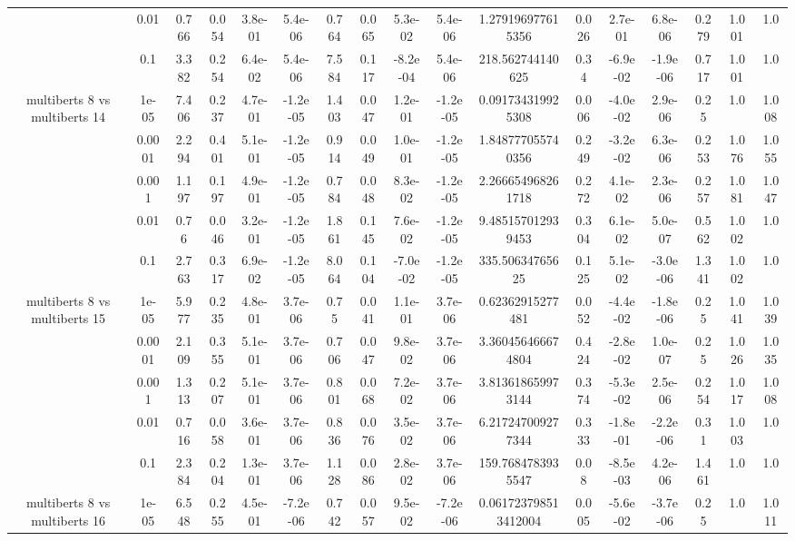 \begin{tabular}{|c|c|c|c|c|c|c|c|c|c|c|c|c|c|c|c|c|}
 & 0.01 & 0.766 & 0.054 & 3.8e-01 & 5.4e-06 & 0.764 & 0.065 & 5.3e-02 & 5.4e-06 & 1.279196977615356 & 0.026 & 2.7e-01 & 6.8e-06 & 0.279 & 1.001 & 1.0 \\
 & 0.1 & 3.382 & 0.254 & 6.4e-02 & 5.4e-06 & 7.584 & 0.117 & -8.2e-04 & 5.4e-06 & 218.562744140625 & 0.34 & -6.9e-02 & -1.9e-06 & 0.717 & 1.001 & 1.0 \\
\hline
\multirow{5}{*}{multiberts 8 vs multiberts 14} & 1e-05 & 7.406 & 0.237 & 4.7e-01 & -1.2e-05 & 1.403 & 0.047 & 1.2e-01 & -1.2e-05 & 0.091734319925308 & 0.006 & -4.0e-02 & 2.9e-06 & 0.25 & 1.0 & 1.008 \\
 & 0.0001 & 2.294 & 0.401 & 5.1e-01 & -1.2e-05 & 0.914 & 0.049 & 1.0e-01 & -1.2e-05 & 1.848777055740356 & 0.249 & -3.2e-02 & 6.3e-06 & 0.253 & 1.076 & 1.055 \\
 & 0.001 & 1.197 & 0.197 & 4.9e-01 & -1.2e-05 & 0.784 & 0.048 & 8.3e-02 & -1.2e-05 & 2.266654968261718 & 0.272 & 4.1e-02 & 2.3e-06 & 0.257 & 1.081 & 1.047 \\
 & 0.01 & 0.76 & 0.046 & 3.2e-01 & -1.2e-05 & 1.861 & 0.145 & 7.6e-02 & -1.2e-05 & 9.485157012939453 & 0.304 & 6.1e-02 & 5.0e-07 & 0.562 & 1.002 & 1.0 \\
 & 0.1 & 2.763 & 0.317 & 6.9e-02 & -1.2e-05 & 8.064 & 0.104 & -7.0e-02 & -1.2e-05 & 335.50634765625 & 0.125 & 5.1e-02 & -3.0e-06 & 1.341 & 1.002 & 1.0 \\
\hline
\multirow{5}{*}{multiberts 8 vs multiberts 15} & 1e-05 & 5.977 & 0.235 & 4.8e-01 & 3.7e-06 & 0.75 & 0.041 & 1.1e-01 & 3.7e-06 & 0.62362915277481 & 0.052 & -4.4e-02 & -1.8e-06 & 0.25 & 1.041 & 1.039 \\
 & 0.0001 & 2.109 & 0.355 & 5.1e-01 & 3.7e-06 & 0.706 & 0.047 & 9.8e-02 & 3.7e-06 & 3.360456466674804 & 0.424 & -2.8e-02 & 1.0e-07 & 0.25 & 1.026 & 1.035 \\
 & 0.001 & 1.313 & 0.207 & 5.1e-01 & 3.7e-06 & 0.801 & 0.068 & 7.2e-02 & 3.7e-06 & 3.813618659973144 & 0.374 & -5.3e-02 & 2.5e-06 & 0.254 & 1.017 & 1.008 \\
 & 0.01 & 0.716 & 0.058 & 3.6e-01 & 3.7e-06 & 0.836 & 0.076 & 3.5e-02 & 3.7e-06 & 6.217247009277344 & 0.333 & -1.8e-01 & -2.2e-06 & 0.31 & 1.003 & 1.0 \\
 & 0.1 & 2.384 & 0.204 & 1.3e-01 & 3.7e-06 & 1.128 & 0.086 & 2.8e-02 & 3.7e-06 & 159.7684783935547 & 0.08 & -8.5e-03 & 4.2e-06 & 1.461 & 1.0 & 1.0 \\
\hline
\multirow{5}{*}{multiberts 8 vs multiberts 16} & 1e-05 & 6.548 & 0.255 & 4.5e-01 & -7.2e-06 & 0.742 & 0.057 & 9.5e-02 & -7.2e-06 & 0.061723798513412004 & 0.005 & -5.6e-02 & -3.7e-06 & 0.25 & 1.0 & 1.011 \\

\end{tabular}
